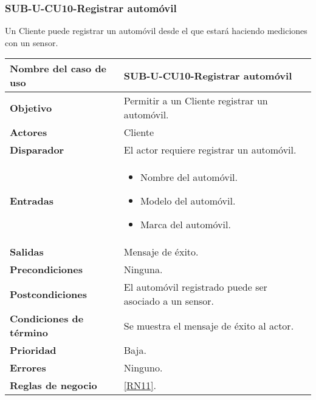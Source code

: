 \subsubsection{SUB-U-CU10-Registrar automóvil}\label{SUB-U-CU10}
Un Cliente puede registrar un automóvil desde el que estará haciendo mediciones con un sensor.

\begin{longtable}{|J{5cm}|J{10.3cm}|}
	\hline
	\textbf{Nombre del caso de uso} &
		SUB-U-CU10-Registrar automóvil \\ \hline
	\textbf{Objetivo} &
		Permitir a un Cliente registrar un automóvil. \\ \hline
	\textbf{Actores} &
		Cliente \\ \hline 
	\textbf{Disparador} & 
		El actor requiere registrar un automóvil. \\ \hline 
	\textbf{Entradas} & 
		\begin{itemize}
				\item Nombre del automóvil.
				\item Modelo del automóvil.
				\item Marca del automóvil.
		\end{itemize}\\ \hline 
	\textbf{Salidas} & Mensaje de éxito.
		\\ \hline
	\textbf{Precondiciones} & Ninguna.
		\\ \hline
	\textbf{Postcondiciones} & El automóvil registrado puede ser asociado a un sensor.
		\\ \hline
	\textbf{Condiciones de término} & Se muestra el mensaje de éxito al actor.
		\\ \hline 
	\textbf{Prioridad} & 
		Baja. \\ \hline
	\textbf{Errores} & Ninguno.
		\\ \hline
	\textbf{Reglas de negocio} & \ref{RN11}.
		 \\ \hline
\end{longtable}

